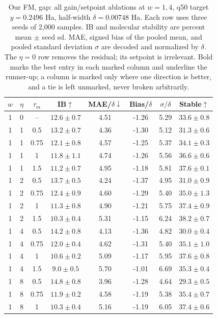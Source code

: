 \documentclass{article}
\begin{document}
\begin{table}[!htbp]
\centering\small
\caption{Our FM, gap: all gain/setpoint ablations at $w=1,4$, q50 target $y=0.2496$ Ha, half-width $\delta=0.00748$ Ha. Each row uses three seeds of 2,000 samples. IB and molecular stability are percent mean $\pm$ seed sd. MAE, signed bias of the pooled mean, and pooled standard deviation $\sigma$ are decoded and normalized by $\delta$. The $\eta=0$ row removes the residual; its setpoint is irrelevant. Bold marks the best entry in each marked column and underline the runner-up; a column is marked only where one direction is better, and a tie is left unmarked, never broken arbitrarily.}
\label{tab:grid-fm-gap}
\begin{tabular}{cccccccc}
\toprule
$w$ & $\eta$ & $\tau_m$ & IB$\uparrow$ & MAE/$\delta\downarrow$ & Bias/$\delta$ & $\sigma/\delta$ & Stable$\uparrow$\\
\midrule
1 & 0 & -- & $12.6\pm0.7$ & 4.51 & -1.26 & 5.29 & $33.6\pm0.8$\\
1 & 1 & 0.5 & $13.2\pm0.7$ & 4.36 & -1.30 & 5.12 & $31.3\pm0.6$\\
1 & 1 & 0.75 & $12.1\pm0.8$ & 4.57 & -1.25 & 5.37 & $34.1\pm0.3$\\
1 & 1 & 1 & $11.8\pm1.1$ & 4.74 & -1.26 & 5.56 & $36.6\pm0.6$\\
1 & 1 & 1.5 & $11.2\pm0.7$ & 4.95 & -1.18 & 5.81 & $37.6\pm0.1$\\
1 & 2 & 0.5 & $13.7\pm0.5$ & 4.24 & -1.37 & 4.95 & $31.0\pm0.9$\\
1 & 2 & 0.75 & $12.4\pm0.9$ & 4.60 & -1.29 & 5.40 & $35.0\pm1.3$\\
1 & 2 & 1 & $11.3\pm0.8$ & 4.90 & -1.21 & 5.75 & $37.4\pm0.9$\\
1 & 2 & 1.5 & $10.3\pm0.4$ & 5.31 & -1.15 & 6.24 & $\mathbf{38.2\pm0.7}$\\
1 & 4 & 0.5 & $14.2\pm0.8$ & 4.13 & -1.36 & 4.82 & $30.0\pm0.4$\\
1 & 4 & 0.75 & $12.0\pm0.4$ & 4.62 & -1.31 & 5.40 & $35.1\pm1.0$\\
1 & 4 & 1 & $10.6\pm0.2$ & 5.09 & -1.17 & 5.95 & $37.6\pm0.8$\\
1 & 4 & 1.5 & $9.0\pm0.5$ & 5.70 & -1.01 & 6.69 & $35.3\pm0.4$\\
1 & 8 & 0.5 & $14.8\pm0.8$ & 3.96 & -1.28 & 4.64 & $29.3\pm0.5$\\
1 & 8 & 0.75 & $11.9\pm0.2$ & 4.58 & -1.19 & 5.38 & $35.4\pm0.7$\\
1 & 8 & 1 & $10.3\pm0.4$ & 5.16 & -1.19 & 6.05 & $37.4\pm0.6$\\

\end{tabular}
\end{table}
\end{document}

